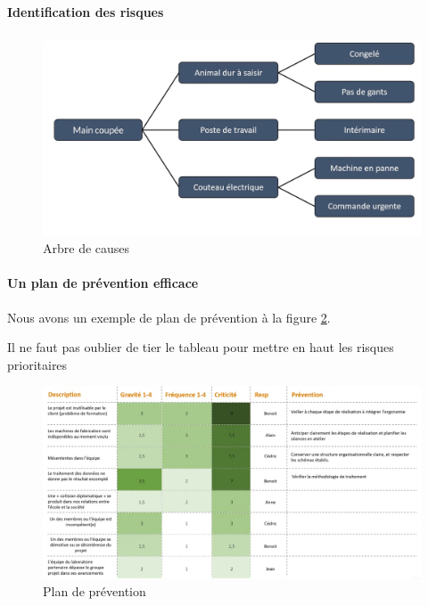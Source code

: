 \paragraph{Identification des risques}
\begin{figure}[!h]
	\begin{center}
		\includegraphics[scale=0.25]{images/arbre_causes.png}
		\caption{Arbre de causes}
		\label{fig:arbre_causes}
	\end{center}
\end{figure}
\paragraph{Un plan de prévention efficace}
Nous avons un exemple de plan de prévention à la figure \ref{fig:plan_prevention}.
\begin{danger}
	Il ne faut pas oublier de tier le tableau pour mettre en haut les risques prioritaires
\end{danger}
\begin{figure}[!h]
	\begin{center}
		\includegraphics[scale=0.25]{images/plan_prevention.png}
		\caption{Plan de prévention}
		\label{fig:plan_prevention}
	\end{center}
\end{figure}
\clearpage
